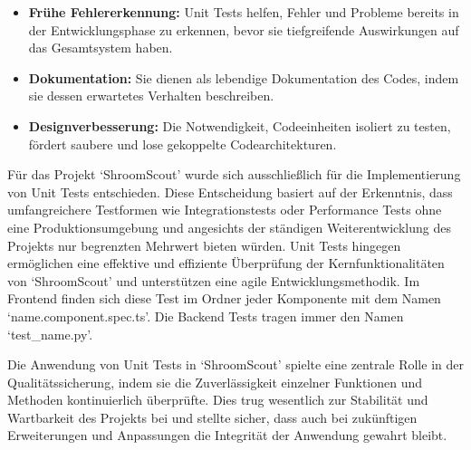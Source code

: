 \begin{itemize}

	\item \textbf{Frühe Fehlererkennung:}
	      Unit Tests helfen, Fehler und Probleme bereits in der Entwicklungsphase zu erkennen, bevor sie tiefgreifende Auswirkungen auf das Gesamtsystem haben.

	\item \textbf{Dokumentation:}
	      Sie dienen als lebendige Dokumentation des Codes, indem sie dessen erwartetes Verhalten beschreiben.

	\item \textbf{Designverbesserung:}
	      Die Notwendigkeit, Codeeinheiten isoliert zu testen, fördert saubere und lose gekoppelte Codearchitekturen.

\end{itemize}

Für das Projekt `ShroomScout' wurde sich ausschließlich für die Implementierung von Unit Tests entschieden. Diese Entscheidung basiert auf der Erkenntnis,
dass umfangreichere Testformen wie Integrationstests oder Performance Tests ohne eine Produktionsumgebung und angesichts der ständigen Weiterentwicklung des
Projekts nur begrenzten Mehrwert bieten würden. Unit Tests hingegen er\-mög\-lich\-en eine effektive und effiziente Überprüfung der Kernfunktionalitäten von
`ShroomScout' und unterstützen eine agile Entwicklungsmethodik. Im Frontend finden sich diese Test im Ordner jeder Komponente mit dem Namen `name.component.spec.ts'.
Die Backend Tests tragen immer den Namen `test\_name.py'.

Die Anwendung von Unit Tests in `ShroomScout' spielte eine zentrale Rolle in der Qua\-li\-täts\-sich\-e\-rung, indem sie die Zuverlässigkeit einzelner
Funktionen und Methoden kontinuierlich überprüfte. Dies trug wesentlich zur Stabilität und Wartbarkeit des Projekts bei und stellte sicher, dass auch bei
zukünftigen Erweiterungen und Anpassungen die Integrität der Anwendung gewahrt bleibt.
